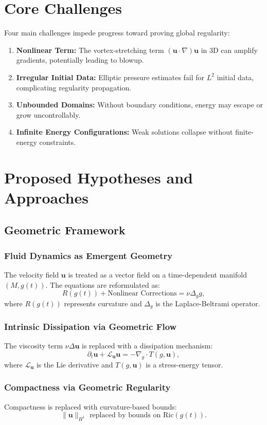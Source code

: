 \documentclass[12pt]{article}
\numberwithin{equation}{section}
\begin{document}
\section{Core Challenges}
Four main challenges impede progress toward proving global regularity:
\begin{enumerate}[label=\textbf{(\roman*)}]
    \item \textbf{Nonlinear Term:} The vortex-stretching term $(\mathbf{u} \cdot \nabla)\mathbf{u}$ in 3D can amplify gradients, potentially leading to blowup.
    \item \textbf{Irregular Initial Data:} Elliptic pressure estimates fail for $L^2$ initial data, complicating regularity propagation.
    \item \textbf{Unbounded Domains:} Without boundary conditions, energy may escape or grow uncontrollably.
    \item \textbf{Infinite Energy Configurations:} Weak solutions collapse without finite-energy constraints.
\end{enumerate}

\section{Proposed Hypotheses and Approaches}
\subsection{Geometric Framework}
\subsubsection{Fluid Dynamics as Emergent Geometry}
The velocity field $\mathbf{u}$ is treated as a vector field on a time-dependent manifold $(M, g(t))$. The equations are reformulated as:
\[
R(g(t)) + \text{Nonlinear Corrections} = \nu \Delta_g g,
\]
where $R(g(t))$ represents curvature and $\Delta_g$ is the Laplace-Beltrami operator.

\subsubsection{Intrinsic Dissipation via Geometric Flow}
The viscosity term $\nu \Delta \mathbf{u}$ is replaced with a dissipation mechanism:
\[
\partial_t \mathbf{u} + \mathcal{L}_\mathbf{u} \mathbf{u} = -\nabla_g \cdot T(g, \mathbf{u}),
\]
where $\mathcal{L}_\mathbf{u}$ is the Lie derivative and $T(g, \mathbf{u})$ is a stress-energy tensor.

\subsubsection{Compactness via Geometric Regularity}
Compactness is replaced with curvature-based bounds:
\[
\|\mathbf{u}\|_{H^1} \text{ replaced by bounds on } \text{Ric}(g(t)).
\]
\end{document}
